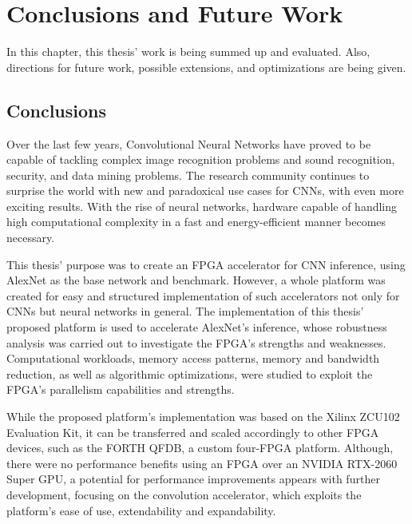 \chapter{Conclusions and Future Work}
\label{Chapter-Conclusions-and-Future-Work}
In this chapter, this thesis' work is being summed up and evaluated. Also, directions for future work, possible extensions, and optimizations are being given.

\section{Conclusions}
Over the last few years, Convolutional Neural Networks have proved to be capable of tackling complex image recognition problems and sound recognition, security, and data mining problems. The research community continues to surprise the world with new and paradoxical use cases for CNNs, with even more exciting results. With the rise of neural networks, hardware capable of handling high computational complexity in a fast and energy-efficient manner becomes necessary.

This thesis' purpose was to create an FPGA accelerator for CNN inference, using AlexNet as the base network and benchmark. However, a whole platform was created for easy and structured implementation of such accelerators not only for CNNs but neural networks in general. The implementation of this thesis' proposed platform is used to accelerate AlexNet's inference, whose robustness analysis was carried out to investigate the FPGA's strengths and weaknesses. Computational workloads, memory access patterns, memory and bandwidth reduction, as well as algorithmic optimizations, were studied to exploit the FPGA's parallelism capabilities and strengths.

While the proposed platform's implementation was based on the Xilinx ZCU102 Evaluation Kit, it can be transferred and scaled accordingly to other FPGA devices, such as the FORTH QFDB, a custom four-FPGA platform. Although, there were no performance benefits using an FPGA over an NVIDIA RTX-2060 Super GPU, a potential for performance improvements appears with further development, focusing on the convolution accelerator, which exploits the platform's ease of use, extendability and expandability.

